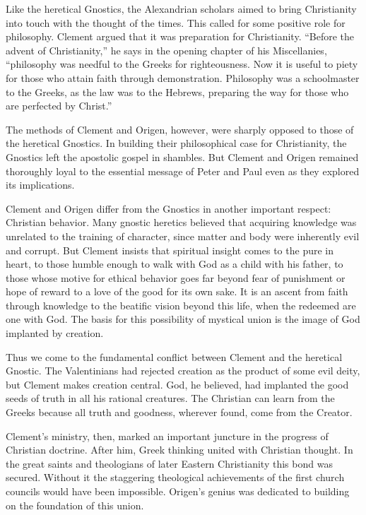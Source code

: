 Like the heretical Gnostics, the Alexandrian scholars aimed to bring Christianity into touch with
the thought of the times. This called for some positive role for philosophy. Clement argued that it
was preparation for Christianity. “Before the advent of Christianity,” he says in the opening
chapter of his Miscellanies, “philosophy was needful to the Greeks for righteousness. Now it is
useful to piety for those who attain faith through demonstration. Philosophy was a schoolmaster to
the Greeks, as the law was to the Hebrews, preparing the way for those who are perfected by Christ.”

The methods of Clement and Origen, however, were sharply opposed to those of the heretical Gnostics.
In building their philosophical case for Christianity, the Gnostics left the apostolic gospel in
shambles. But Clement and Origen remained thoroughly loyal to the essential message of Peter and
Paul even as they explored its implications.

Clement and Origen differ from the Gnostics in another important respect: Christian behavior. Many
gnostic heretics believed that acquiring knowledge was unrelated to the training of character, since
matter and body were inherently evil and corrupt. But Clement insists that spiritual insight comes
to the pure in heart, to those humble enough to walk with God as a child with his father, to those
whose motive for ethical behavior goes far beyond fear of punishment or hope of reward to a love of
the good for its own sake. It is an ascent from faith through knowledge to the beatific vision
beyond this life, when the redeemed are one with God. The basis for this possibility of mystical
union is the image of God implanted by creation.

Thus we come to the fundamental conflict between Clement and the heretical Gnostic. The Valentinians
had rejected creation as the product of some evil deity, but Clement makes creation central. God, he
believed, had implanted the good seeds of truth in all his rational creatures. The Christian can
learn from the Greeks because all truth and goodness, wherever found, come from the Creator.

Clement’s ministry, then, marked an important juncture in the progress of Christian doctrine. After
him, Greek thinking united with Christian thought. In the great saints and theologians of later
Eastern Christianity this bond was secured. Without it the staggering theological achievements of
the first church councils would have been impossible. Origen’s genius was dedicated to building on
the foundation of this union.

